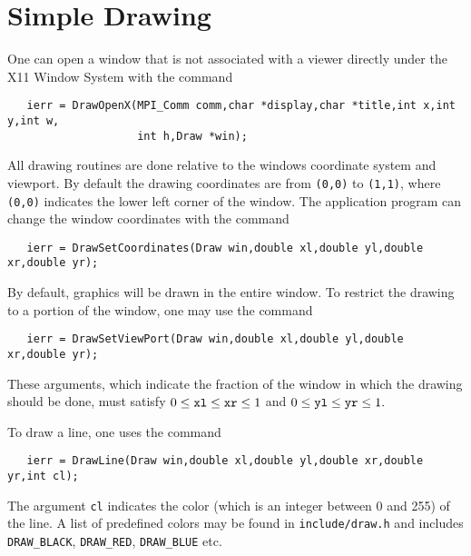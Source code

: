 {\section{Simple Drawing}

One can open a window that is not associated with a viewer directly 
under the X11 Window System with the
command  
\begin{verbatim}
   ierr = DrawOpenX(MPI_Comm comm,char *display,char *title,int x,int y,int w,
                    int h,Draw *win);
\end{verbatim}
All drawing routines are done relative to the windows coordinate system 
and viewport. By default the drawing coordinates are from {\tt (0,0)} to 
{\tt (1,1)}, where {\tt (0,0)} indicates the lower left corner of the 
window. The application program can change the window coordinates with the 
command  
\begin{verbatim}
   ierr = DrawSetCoordinates(Draw win,double xl,double yl,double xr,double yr);
\end{verbatim}
By default, graphics will be drawn in the entire window. To restrict the 
drawing to a portion of the window, one may 
use the command 
\begin{verbatim}
   ierr = DrawSetViewPort(Draw win,double xl,double yl,double xr,double yr);
\end{verbatim}
These arguments, which indicate the fraction of the window in which the 
drawing should be done, must satisfy 
$ 0 \le {\tt xl} \le {\tt xr} \le 1 $ and $ 0 \le {\tt yl} \le {\tt yr} \le 1.$ 

To draw a line, one uses
 the command  
\begin{verbatim}
   ierr = DrawLine(Draw win,double xl,double yl,double xr,double yr,int cl);
\end{verbatim}
The argument {\tt cl} indicates the color (which is an integer between 0 and 255)
of the line. A list of predefined colors may be found in {\tt include/draw.h}
and includes {\tt DRAW\_BLACK}, {\tt DRAW\_RED}, {\tt DRAW\_BLUE} etc.

}
